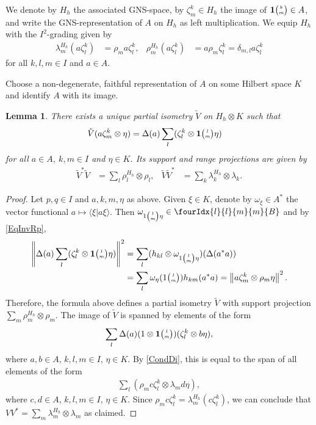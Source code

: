 \documentclass[11pt]{article}
\newcommand{\Grt}[3]{#1{\tiny {\begin{pmatrix} #2\\#3\end{pmatrix}}}}
\newcommand{\UnitC}[2]{\Grt{\mathbf{1}}{#1}{#2}}
\newcommand{\Grru}[2]{{\tiny \begin{pmatrix} #1 \\ #2\end{pmatrix}}}
\newcommand{\Gr}[5]{\fourIdx{#2}{#4}{#3}{#5}{#1}}%
\newtheorem{Lem}[Theorem]{Lemma}
\theoremstyle{definition}
\numberwithin{equation}{section}
\begin{document}
 
 We denote by $H_{h}$ the associated GNS-space, by $\zeta^k_m \in H_{h}$ the image of $\UnitC{k}{m}
 \in A$, and write the GNS-representation of $A$ on $H_{h}$ as left multiplication.  We equip 
 $H_{h}$ with the $I^{2}$-grading given by
 \begin{align*}
   \lambda^{H_{h}}_{m}  (a\zeta^{k}_{l}) &=  \rho_{m}a \zeta^{k}_{l}, &
   \rho^{H_{h}}_{m} (a\zeta^{k}_{l}) &= a\rho_{m} \zeta^{k}_{l} = \delta_{m,l} a\zeta^{k}_{l}
 \end{align*}
 for all $k,l,m\in I$ and $a\in A$.

 Choose a non-degenerate, faithful representation of $A$ on some Hilbert space $K$ and identify $A$
 with its image.
 \begin{Lem}\label{lem:reg-corep-pi}
   There exists a unique partial isometry $\tilde V$ on $H_{h} \otimes
   K$ such
   that
   \begin{align*}
     \tilde V(a \zeta^k_m \otimes \eta) &=
     \Delta(a) \sum_{l}(\zeta^{k}_{l} \otimes \UnitC{l}{m}\eta)
   \end{align*}
   for all $a\in A$, $k,m\in I$ and $\eta\in K$. Its support and range
   projections are given by
   \begin{align*}
     \tilde V^{*}\tilde V &= \sum_{l} \rho^{H_{h}}_{l} \otimes \rho_{l}, &
     \tilde V \tilde V^{*} &= \sum_{k} \lambda^{H_{h}}_{k} \otimes \lambda_{k}.
   \end{align*}
 \end{Lem}
 \begin{proof}
   Let $p,q\in I$ and $a,k,m,\eta$ as above. Given $\xi \in K$, denote by $\omega_{\xi}\in A^{*}$ the vector
   functional $a \mapsto \langle \xi|a\xi\rangle$.
   Then $\omega_{1\Grru{l}{m}\eta} \in \Gr{B}{l}{m}{l}{m}$ and by \eqref{EqInvRp},
\begin{align*}
  \left\|\Delta(a)\sum_{l}(\zeta^{k}_{l}\otimes \UnitC{l}{m}\eta)\right\|^{2} &= \sum_{l} (h_{kl}
  \otimes \omega_{1\Grru{l}{m}\eta})(\Delta(a^{*}a)) \\
  &= \sum_{l}\omega_{\eta}(1\Grru{l}{m}) h_{km}(a^{*}a) 
  = \left\|a\zeta^{k}_{m} \otimes  \rho_{m}\eta \right\|^{2}.
\end{align*}
Therefore, the formula above defines a partial isometry $\tilde V$ with support projection $\sum_{m}
\rho^{H_{h}}_{m} \otimes \rho_{m}$. The image of $\tilde V$ is spanned by elements of the form
\begin{align*}
\sum_{l}   \Delta(a)(1 \otimes \UnitC{l}{m}) (\zeta^{k}_{l} \otimes b\eta),
\end{align*}
where $a,b\in A$, $k,l,m\in I$, $\eta\in K$. By  \eqref{CondDi}, this is equal to the span of all
elements of the form
\begin{align*}
  \sum_{l} (\rho_{m}c \zeta^{k}_{l} \otimes \lambda_{m}d\eta),
\end{align*}
where $c,d\in A$, $k,l,m \in I$, $\eta\in K$. Since $\rho_{m}c\zeta^{k}_{l} =
\lambda^{H_{h}}_{m}(c\zeta^{k}_{l})$, we can conclude that $VV^{*}=\sum_{m} \lambda^{H_{h}}_{m}
\otimes \lambda_{m}$ as claimed.
 \end{proof}
\end{document}
